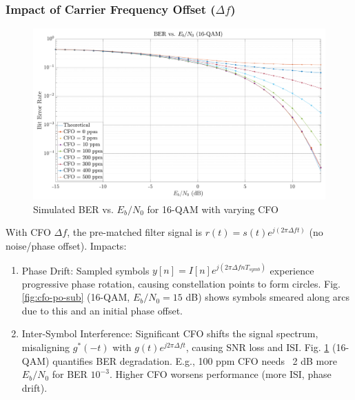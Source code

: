 \documentclass[11pt]{article}
\begin{document}
	\subsubsection{Impact of Carrier Frequency Offset ($\Delta f$)}
	\begin{figure}[H]
		\centering
		\includegraphics[width=0.8\linewidth]{ber-cfo}
		\caption{Simulated BER vs. $E_b/N_0$ for 16-QAM with varying CFO}
		\label{fig:ber-cfo}
	\end{figure}
	With CFO $\Delta f$, the pre-matched filter signal is $r(t) = s(t) e^{j(2\pi \Delta f t)}$ (no noise/phase offset). Impacts:
	\begin{enumerate}
		\item Phase Drift: Sampled symbols $y[n] = I[n] e^{j(2\pi \Delta f nT_{symb})}$ experience progressive phase rotation, causing constellation points to form circles. Fig. \ref{fig:cfo-po-sub} (16-QAM, $E_b/N_0=15$ dB) shows symbols smeared along arcs due to this and an initial phase offset.
		\item Inter-Symbol Interference: Significant CFO shifts the signal spectrum, misaligning $g^*(-t)$ with $g(t)e^{j2\pi \Delta f t}$, causing SNR loss and ISI. Fig. \ref{fig:ber-cfo} (16-QAM) quantifies BER degradation. E.g., 100 ppm CFO needs ~2 dB more $E_b/N_0$ for BER $10^{-3}$. Higher CFO worsens performance (more ISI, phase drift).
	\end{enumerate}
	
\end{document}
